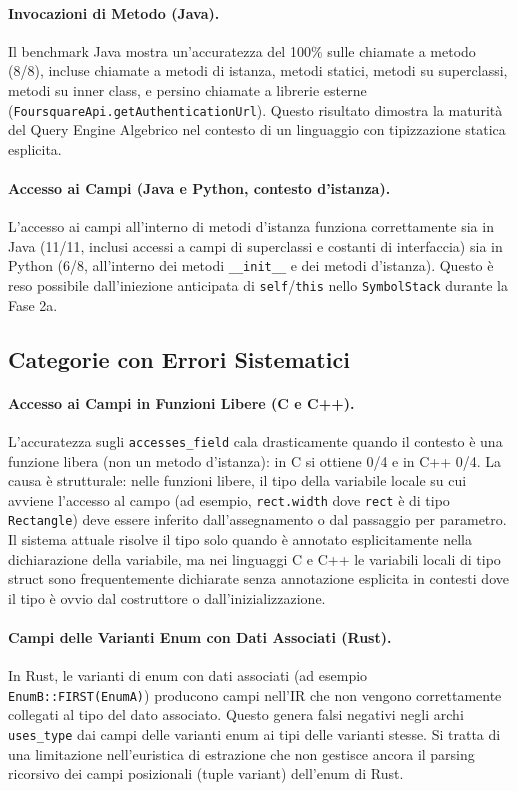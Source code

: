 \paragraph{Invocazioni di Metodo (Java).}
Il benchmark Java mostra un'accuratezza del 100\% sulle chiamate a
metodo (8/8), incluse chiamate a metodi di istanza, metodi statici,
metodi su superclassi, metodi su inner class, e persino chiamate a
librerie esterne (\texttt{FoursquareApi.getAuthenticationUrl}). Questo
risultato dimostra la maturità del Query Engine Algebrico nel contesto
di un linguaggio con tipizzazione statica esplicita.

\paragraph{Accesso ai Campi (Java e Python, contesto d'istanza).}
L'accesso ai campi all'interno di metodi d'istanza funziona
correttamente sia in Java (11/11, inclusi accessi a campi di
superclassi e costanti di interfaccia) sia in Python (6/8,
all'interno dei metodi \texttt{\_\_init\_\_} e dei metodi d'istanza).
Questo è reso possibile dall'iniezione anticipata di
\texttt{self}/\texttt{this} nello \texttt{SymbolStack} durante la
Fase 2a.

\subsection{Categorie con Errori Sistematici}

\paragraph{Accesso ai Campi in Funzioni Libere (C e C++).}
L'accuratezza sugli \texttt{accesses\_field} cala drasticamente
quando il contesto è una funzione libera (non un metodo d'istanza): in
C si ottiene 0/4 e in C++ 0/4. La causa è strutturale: nelle funzioni
libere, il tipo della variabile locale su cui avviene l'accesso al
campo (ad esempio, \texttt{rect.width} dove \texttt{rect} è di tipo
\texttt{Rectangle}) deve essere inferito dall'assegnamento o dal
passaggio per parametro. Il sistema attuale risolve il tipo solo
quando è annotato esplicitamente nella dichiarazione della variabile,
ma nei linguaggi C e C++ le variabili locali di tipo struct sono
frequentemente dichiarate senza annotazione esplicita in contesti dove
il tipo è ovvio dal costruttore o dall'inizializzazione.

\paragraph{Campi delle Varianti Enum con Dati Associati (Rust).}
In Rust, le varianti di enum con dati associati (ad esempio
\texttt{EnumB::FIRST(EnumA)}) producono campi nell'IR che non vengono
correttamente collegati al tipo del dato associato. Questo genera
falsi negativi negli archi \texttt{uses\_type} dai campi delle
varianti enum ai tipi delle varianti stesse. Si tratta di una
limitazione nell'euristica di estrazione che non gestisce ancora il
parsing ricorsivo dei campi posizionali (tuple variant) dell'enum di
Rust.

